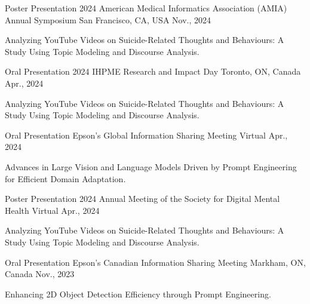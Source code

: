 
\vspace*{0.05cm}
\begin{cventries}
\cventry
{Poster Presentation} %
{2024 American Medical Informatics Association (AMIA) Annual Symposium} %
{San Francisco, CA, USA} %
{Nov., 2024} %
{ %
\begin{cvitems}
\item {Analyzing YouTube Videos on Suicide-Related Thoughts and Behaviours: A Study Using Topic Modeling and Discourse Analysis.}
\end{cvitems}
}
\cventry
{Oral Presentation} %
{2024 IHPME Research and Impact Day} %
{Toronto, ON, Canada} %
{Apr., 2024} %
{ %
\begin{cvitems}
\item {Analyzing YouTube Videos on Suicide-Related Thoughts and Behaviours: A Study Using Topic Modeling and Discourse Analysis.}
\end{cvitems}
}
\cventry
{Oral Presentation} %
{Epson's Global Information Sharing Meeting} %
{Virtual} %
{Apr., 2024} %
{ %
\begin{cvitems}
\item {Advances in Large Vision and Language Models Driven by Prompt Engineering for Efficient Domain Adaptation.}
\end{cvitems}
}
\cventry
{Poster Presentation} %
{2024 Annual Meeting of the Society for Digital Mental Health} %
{Virtual} %
{Apr., 2024} %
{ %
\begin{cvitems}
\item {Analyzing YouTube Videos on Suicide-Related Thoughts and Behaviours: A Study Using Topic Modeling and Discourse Analysis.}
\end{cvitems}
}
\cventry
{Oral Presentation} %
{Epson's Canadian Information Sharing Meeting} %
{Markham, ON, Canada} %
{Nov., 2023} %
{ %
\begin{cvitems}
\item {Enhancing 2D Object Detection Efficiency through Prompt Engineering.}

\end{cvitems}}
\end{cventries}
